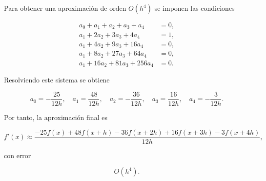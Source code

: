 \documentclass[12pt,a4paper]{article}
\theoremstyle{definition}
\theoremstyle{remark}
\begin{document}
Para obtener una aproximación de orden $O(h^4)$ se imponen las condiciones

\begin{align}
a_0+a_1+a_2+a_3+a_4 &= 0, \\
a_1+2a_2+3a_3+4a_4 &= 1, \\
a_1+4a_2+9a_3+16a_4 &= 0, \\
a_1+8a_2+27a_3+64a_4 &= 0, \\
a_1+16a_2+81a_3+256a_4 &= 0.
\end{align}

Resolviendo este sistema se obtiene

\[
a_0=-\frac{25}{12h},\quad
a_1=\frac{48}{12h},\quad
a_2=-\frac{36}{12h},\quad
a_3=\frac{16}{12h},\quad
a_4=-\frac{3}{12h}.
\]

Por tanto, la aproximación final es

\[
f'(x) \approx 
\frac{-25f(x)+48f(x+h)-36f(x+2h)+16f(x+3h)-3f(x+4h)}{12h},
\]

con error

\[
O(h^4).
\]
\end{document}
